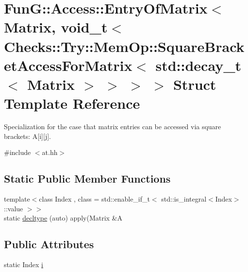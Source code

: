 \hypertarget{structFunG_1_1Access_1_1EntryOfMatrix_3_01Matrix_00_01void__t_3_01Checks_1_1Try_1_1MemOp_1_1Squa64f8314119f1d5e2cd3b3016365cec8d}{\section{\-Fun\-G\-:\-:\-Access\-:\-:\-Entry\-Of\-Matrix$<$ \-Matrix, void\-\_\-t$<$ \-Checks\-:\-:\-Try\-:\-:\-Mem\-Op\-:\-:\-Square\-Bracket\-Access\-For\-Matrix$<$ std\-:\-:decay\-\_\-t$<$ \-Matrix $>$ $>$ $>$ $>$ \-Struct \-Template \-Reference}
\label{structFunG_1_1Access_1_1EntryOfMatrix_3_01Matrix_00_01void__t_3_01Checks_1_1Try_1_1MemOp_1_1Squa64f8314119f1d5e2cd3b3016365cec8d}
}


\-Specialization for the case that matrix entries can be accessed via square brackets\-: \-A\mbox{[}i\mbox{]}\mbox{[}j\mbox{]}.  




{\ttfamily \#include $<$at.\-hh$>$}

\subsection*{\-Static \-Public \-Member \-Functions}
\begin{DoxyCompactItemize}
\item 
{\footnotesize template$<$class Index , class  = std\-::enable\-\_\-if\-\_\-t$<$ std\-::is\-\_\-integral$<$\-Index$>$\-::value $>$$>$ }\\static \hyperlink{structFunG_1_1Access_1_1EntryOfMatrix_3_01Matrix_00_01void__t_3_01Checks_1_1Try_1_1MemOp_1_1Squa64f8314119f1d5e2cd3b3016365cec8d_a0192fefe89150c1bea5499e6f0b53083}{decltype} (auto) apply(\-Matrix \&\-A
\end{DoxyCompactItemize}
\subsection*{\-Public \-Attributes}
\begin{DoxyCompactItemize}
\item 
static \-Index \hyperlink{structFunG_1_1Access_1_1EntryOfMatrix_3_01Matrix_00_01void__t_3_01Checks_1_1Try_1_1MemOp_1_1Squa64f8314119f1d5e2cd3b3016365cec8d_a45fac27a7277328556e8dcc5f067835f}{i}
\end{DoxyCompactItemize}


